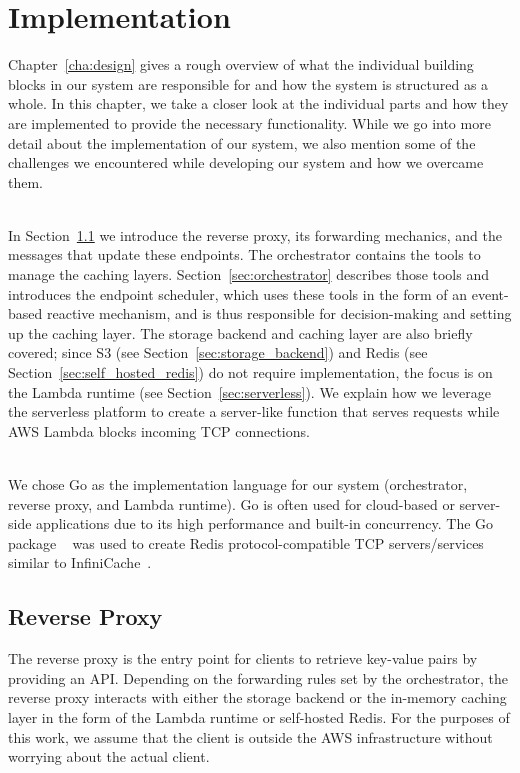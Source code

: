 \chapter{Implementation}
\label{cha:implementation}
Chapter~\ref{cha:design} gives a rough overview of what the individual building blocks in our system are responsible for and how the system is structured as a whole. In this chapter, we take a closer look at the individual parts and how they are implemented to provide the necessary functionality. While we go into more detail about the implementation of our system, we also mention some of the challenges we encountered while developing our system and how we overcame them. 

~\\
In Section~\ref{sec:reverse_proxy} we introduce the reverse proxy, its forwarding mechanics, and the messages that update these endpoints. 
The orchestrator contains the tools to manage the caching layers. Section~\ref{sec:orchestrator} describes those tools and introduces the endpoint scheduler, which uses these tools in the form of an event-based reactive mechanism, and is thus responsible for decision-making and setting up the caching layer. The storage backend and caching layer are also briefly covered; since S3 (see Section~\ref{sec:storage_backend}) and Redis (see Section~\ref{sec:self_hosted_redis}) do not require implementation, the focus is on the Lambda runtime (see Section~\ref{sec:serverless}). We explain how we leverage the serverless platform to create a server-like function that serves requests while AWS Lambda blocks incoming TCP connections. 

~\\
We chose Go as the implementation language for our system (orchestrator, reverse proxy, and Lambda runtime). Go is often used for cloud-based or server-side applications due to its high performance and built-in concurrency. The Go package ~\cite{noauthor_redeo_nodate-1} was used to create Redis protocol-compatible TCP servers/services similar to InfiniCache~\cite{wang_infinicache_2020}.

\section{Reverse Proxy}
\label{sec:reverse_proxy}
The reverse proxy is the entry point for clients to retrieve key-value pairs by providing an API. Depending on the forwarding rules set by the orchestrator, the reverse proxy interacts with either the storage backend or the in-memory caching layer in the form of the Lambda runtime or self-hosted Redis. For the purposes of this work, we assume that the client is outside the AWS infrastructure without worrying about the actual client.

